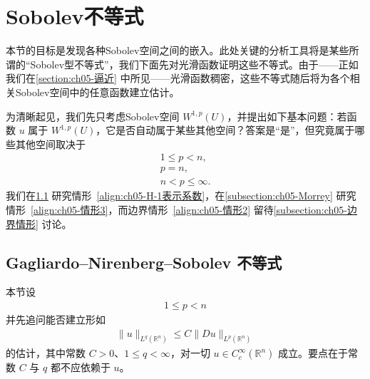 \documentclass[../../main.tex]{subfiles}
\begin{document}
\section{Sobolev不等式}\label{section:ch05-Sobolev不等式}

本节的目标是发现各种Sobolev空间之间的嵌入。此处关键的分析工具将是某些所谓的“Sobolev型不等式”，我们下面先对光滑函数证明这些不等式。由于——正如我们在\cref{section:ch05-逼近} 中所见——光滑函数稠密，这些不等式随后将为各个相关Sobolev空间中的任意函数建立估计。

为清晰起见，我们先只考虑Sobolev空间 $W^{1,p}(U)$，并提出如下基本问题：若函数 $u$ 属于 $W^{1,p}(U)$，它是否自动属于某些其他空间？答案是“是”，但究竟属于哪些其他空间取决于
\begin{gather}
1\leqslant p<n, \label{align:ch05-H-1表示系数}\\
p=n, \label{align:ch05-情形2}\\
n<p\leqslant\infty. \label{align:ch05-情形3}
\end{gather}
我们在\cref{subsection:ch05-GNS} 研究情形~\eqref{align:ch05-H-1表示系数}，在\cref{subsection:ch05-Morrey} 研究情形~\eqref{align:ch05-情形3}，而边界情形~\eqref{align:ch05-情形2} 留待\cref{subsection:ch05-边界情形} 讨论。

\subsection{Gagliardo--Nirenberg--Sobolev 不等式}\label{subsection:ch05-GNS}

本节设
\begin{align}
1\leqslant p<n
\end{align}
并先追问能否建立形如
\begin{align}
\|u\|_{L^{q}(\mathbb{R}^{n})}\leqslant C\|Du\|_{L^{p}(\mathbb{R}^{n})}
\label{align:ch05-H1估计}
\end{align}
的估计，其中常数 $C>0$、$1\leqslant q<\infty$，对一切 $u\in C^{\infty}_{c}(\mathbb{R}^{n})$ 成立。要点在于常数 $C$ 与 $q$ 都不应依赖于 $u$。
\end{document}
